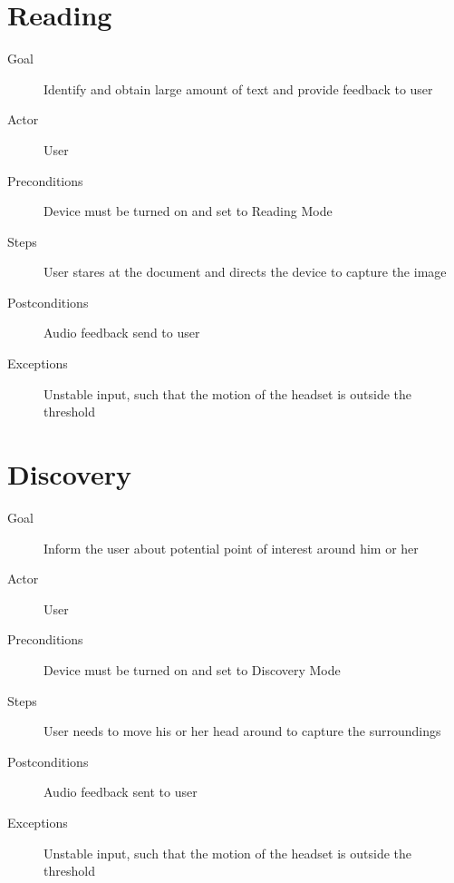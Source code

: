 \section{Reading}
\begin{description}
\item [Goal] Identify and obtain large amount of text and provide feedback to user
\item [Actor] User
\item [Preconditions] Device must be turned on and set to Reading Mode
\item [Steps] User stares at the document and directs the device to capture the image
\item [Postconditions] Audio feedback send to user
\item [Exceptions] Unstable input, such that the motion of the headset is outside the threshold
\end{description}


\vspace{5mm}


\section{Discovery}
\begin{description}
\item [Goal] Inform the user about potential point of interest around him or her
\item [Actor] User
\item [Preconditions] Device must be turned on and set to Discovery Mode
\item [Steps] User needs to move his or her head around to capture the surroundings
\item [Postconditions] Audio feedback sent to user
\item [Exceptions] Unstable input, such that the motion of the headset is outside the threshold
\end{description}